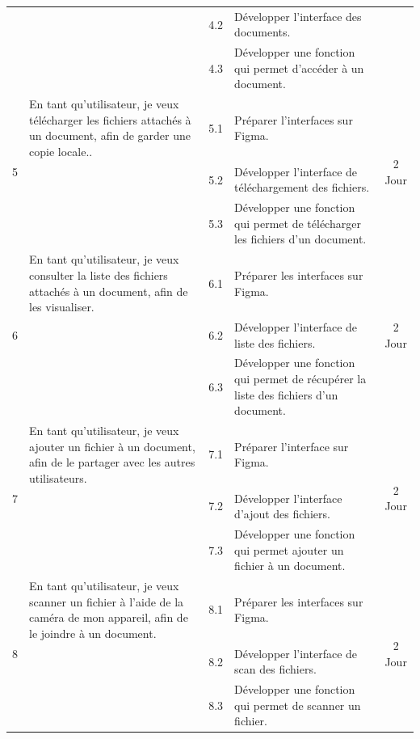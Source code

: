 \begin{adjustwidth}{-1cm}{}
\begin{longtable}{|c|p{6cm}|c|p{6cm}|c|}
      \cline{3-4}
      & & 4.2 & Développer l'interface des documents. & \\
      \cline{3-4}
      & & 4.3 & Développer une fonction qui permet d'accéder à un document. & \\
      \cline{1-5}
      \multirow{3}{*}{5} & En tant qu'utilisateur, je veux télécharger les fichiers attachés à un document, afin de garder une copie locale.. & 5.1 & Préparer l'interfaces sur Figma. & \multirow{3}{*}{2 Jour} \\
      \cline{3-4}
      & & 5.2 & Développer l'interface de téléchargement des fichiers. & \\
      \cline{3-4}
      & & 5.3 & Développer une fonction qui permet de télécharger les fichiers d'un document. & \\
      \cline{1-5}
      \multirow{3}{*}{6} & En tant qu’utilisateur, je veux consulter la liste des fichiers attachés à un document, afin de les visualiser. & 6.1 & Préparer les interfaces sur Figma. & \multirow{3}{*}{2 Jour} \\
      \cline{3-4}
      & & 6.2 & Développer l'interface de liste des fichiers. & \\
      \cline{3-4}
      & & 6.3 & Développer une fonction qui permet de récupérer la liste des fichiers d'un document. & \\
      \cline{1-5}
      \multirow{3}{*}{7} & En tant qu'utilisateur, je veux ajouter un fichier à un document, afin de le partager avec les autres utilisateurs. & 7.1 & Préparer l'interface sur Figma. & \multirow{3}{*}{2 Jour} \\
      \cline{3-4}
      & & 7.2 & Développer l'interface d'ajout des fichiers. & \\
      \cline{3-4}
      & & 7.3 & Développer une fonction qui permet ajouter un fichier à un document. & \\
      \cline{1-5}
      \multirow{3}{*}{8} & En tant qu'utilisateur, je veux scanner un fichier à l'aide de la caméra de mon appareil, afin de le joindre à un document. & 8.1 & Préparer les interfaces sur Figma. & \multirow{3}{*}{2 Jour} \\
      \cline{3-4}
      & & 8.2 & Développer l'interface de scan des fichiers. & \\
      \cline{3-4}
      & & 8.3 & Développer une fonction qui permet de scanner un fichier. & \\

\end{longtable}
\end{adjustwidth}

